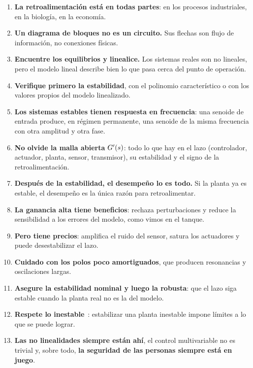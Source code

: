 \begin{enumerate}
  \item \textbf{La retroalimentación está en todas partes}: en los procesos industriales, en la biología, en la economía.
  \item \textbf{Un diagrama de bloques no es un circuito.} Sus flechas son flujo de información, no conexiones físicas.
  \item \textbf{Encuentre los equilibrios y linealice.} Los sistemas reales son no lineales, pero el modelo lineal describe bien lo que pasa cerca del punto de operación.
  \item \textbf{Verifique primero la estabilidad}, con el polinomio característico o con los valores propios del modelo linealizado.
  \item \textbf{Los sistemas estables tienen respuesta en frecuencia}: una senoide de entrada produce, en régimen permanente, una senoide de la misma frecuencia con otra amplitud y otra fase.
  \item \textbf{No olvide la malla abierta} $G'(s)$: todo lo que hay en el lazo (controlador, actuador, planta, sensor, transmisor), su estabilidad y el signo de la retroalimentación.
  \item \textbf{Después de la estabilidad, el desempeño lo es todo.} Si la planta ya es estable, el desempeño es la única razón para retroalimentar.
  \item \textbf{La ganancia alta tiene beneficios}: rechaza perturbaciones y reduce la sensibilidad a los errores del modelo, como vimos en el tanque.
  \item \textbf{Pero tiene precios}: amplifica el ruido del sensor, satura los actuadores y puede desestabilizar el lazo.
  \item \textbf{Cuidado con los polos poco amortiguados}, que producen resonancias y oscilaciones largas.
  \item \textbf{Asegure la estabilidad nominal y luego la robusta}: que el lazo siga estable cuando la planta real no es la del modelo.
  \item \textbf{Respete lo inestable}~\citep{Ste03}: estabilizar una planta inestable impone límites a lo que se puede lograr.
  \item \textbf{Las no linealidades siempre están ahí}, el control multivariable no es trivial y, sobre todo, \textbf{la seguridad de las personas siempre está en juego}.
\end{enumerate}
